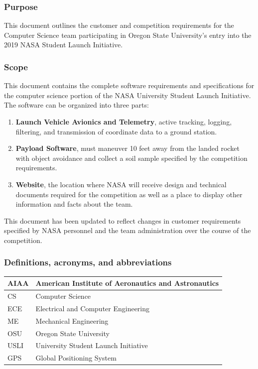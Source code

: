 \documentclass[onecolumn, draftclsnofoot, 10pt, compsoc]{IEEEtran}
\begin{document}
\subsubsection{Purpose}
This document outlines the customer and competition requirements for the Computer Science team participating in Oregon State University's entry into the 2019 NASA Student Launch Initiative. 

\subsubsection{Scope} %
This document contains the complete software requirements and specifications for the computer science portion of the NASA University Student Launch Initiative.  The software can be organized into three parts:

\begin{enumerate}
\item \textbf{Launch Vehicle Avionics and Telemetry}, active tracking, logging, filtering, and transmission of coordinate data to a ground station.
\item \textbf{Payload Software}, must maneuver 10 feet away from the landed rocket with object avoidance and collect a soil sample specified by the competition requirements.
\item \textbf{Website}, the location where NASA will receive design and technical documents required for the competition as well as a place to display other information and facts about the team.
\end{enumerate}

This document has been updated to reflect changes in customer requirements specified by NASA personnel and the team administration over the course of the competition.

\subsubsection{Definitions, acronyms, and abbreviations}
\begin{center}
  \begin{tabular}{|l|l|}
      \hline
      AIAA	&American Institute of Aeronautics and Astronautics\\
      \hline
      CS		&Computer Science\\
      \hline
      ECE		&Electrical and Computer Engineering\\
      \hline
      ME		&Mechanical Engineering\\
      \hline
      OSU		&Oregon State University\\
      \hline
      USLI		&University Student Launch Initiative\\
      \hline
      GPS       &Global Positioning System\\
      \hline
  \end{tabular}
\end{center}
\end{document}
